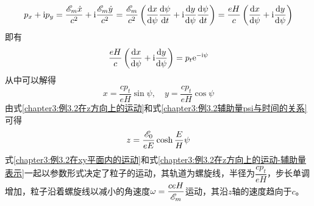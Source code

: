 \begin{solution}
\begin{equation*}
	p_x+\mathrm{i} p_y = \frac{\mathscr{E}_m\dot{x}}{c^2} + \mathrm{i} \frac{\mathscr{E}_m\dot{y}}{c^2} = \frac{\mathscr{E}_m}{c^2} \left(\frac{\mathrm{d} x}{\mathrm{d} \psi} \frac{\mathrm{d} \psi}{\mathrm{d} t} + \mathrm{i} \frac{\mathrm{d} y}{\mathrm{d} \psi} \frac{\mathrm{d} \psi}{\mathrm{d} t}\right) = \dfrac{eH}{c}\left(\frac{\mathrm{d} x}{\mathrm{d} \psi} + \mathrm{i} \frac{\mathrm{d} y}{\mathrm{d} \psi}\right)
\end{equation*}
即有
\begin{equation*}
	\dfrac{eH}{c}\left(\frac{\mathrm{d} x}{\mathrm{d} \psi} + \mathrm{i} \frac{\mathrm{d} y}{\mathrm{d} \psi}\right) = p_t\mathrm{e}^{-\mathrm{i} \psi}
\end{equation*}
从中可以解得
\begin{equation}
	x = \frac{cp_t}{eH}\sin \psi,\quad y = \frac{cp_t}{eH}\cos\psi
	\label{chapter3:例3.2在xy平面内的运动}
\end{equation}
由式\eqref{chapter3:例3.2在z方向上的运动}和式\eqref{chapter3:例3.2辅助量psi与时间的关系}可得
\begin{equation}
	z = \frac{\mathscr{E}_0}{eE}\cosh\frac{E}{H}\psi
	\label{chapter3:例3.2在z方向上的运动-辅助量表示}
\end{equation}
式\eqref{chapter3:例3.2在xy平面内的运动}和式\eqref{chapter3:例3.2在z方向上的运动-辅助量表示}一起以参数形式决定了粒子的运动，其轨道为螺旋线，半径为$\dfrac{cp_t}{eH}$，步长单调增加，粒子沿着螺旋线以减小的角速度$\omega = \dfrac{ceH}{\mathscr{E}_m}$运动，其沿$z$轴的速度趋向于$c$。
\end{solution}

